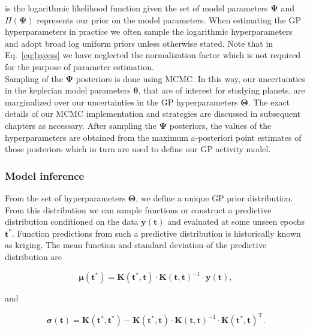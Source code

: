 \noindent is the logarithmic likelihood function given the set of model parameters
$\boldsymbol{\Psi}$ and $\Pi(\boldsymbol{\Psi})$ represents our prior on
the model parameters. When estimating the GP hyperparameters in practice we
often sample the logarithmic hyperparameters and adopt broad log uniform priors
unless otherwise stated. Note that in Eq.~\ref{eq:bayess}
we have neglected the normalization factor which is not required
for the purpose of parameter estimation. \\

Sampling of the $\boldsymbol{\Psi}$ posteriors is done using MCMC. In this way, our
uncertainties in the keplerian model parameters $\boldsymbol{\theta}$,
that are of interest for studying planets, are marginalized over our uncertainties in
the GP hyperparameters $\boldsymbol{\Theta}$. The exact details of
our MCMC implementation and strategies are discussed in subsequent chapters
as necessary. After sampling the $\boldsymbol{\Psi}$ posteriors, the values of the
hyperparameters are obtained from the maximum a-posteriori point estimates of those
posteriors which in turn are used to define our GP activity model.

\subsubsection{Model inference}
From the set of hyperparameters $\boldsymbol{\Theta}$,
we define a unique GP prior distribution. From this distribution we can sample
functions or construct a predictive distribution
conditioned on the data $\mathbf{y}(\mathbf{t})$ and evaluated at some unseen
epochs $\mathbf{t}^*$. Function predictions from such a predictive distribution is
historically known as kriging. The mean function and standard deviation of the
predictive distribution are

\begin{equation}
  \boldsymbol{\mu}(\mathbf{t}^*) = \mathbf{K}(\mathbf{t}^*,\mathbf{t}) \cdot
  \mathbf{K}(\mathbf{t},\mathbf{t})^{-1} \cdot \mathbf{y}(\mathbf{t}),
  \label{eq:gpmu}
\end{equation}

\noindent and

\begin{equation}
  \boldsymbol{\sigma}(\mathbf{t}) = \mathbf{K}(\mathbf{t}^*,\mathbf{t}^*) -
  \mathbf{K}(\mathbf{t}^*,\mathbf{t}) \cdot \mathbf{K}(\mathbf{t},\mathbf{t})^{-1}
  \cdot \mathbf{K}(\mathbf{t}^*,\mathbf{t})^{\text{T}}.
  \label{eq:gpsig}
\end{equation}

